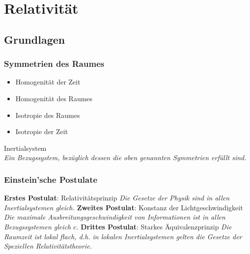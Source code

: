 \documentclass[11pt]{article}
\numberwithin{equation}{section}
\begin{document}
	\section{Relativität}
		\subsection{Grundlagen}
			\subsubsection{Symmetrien des Raumes}
        \begin{itemize}
          \item Homogenität der Zeit
          \item Homogenität des Raumes
          \item Isotropie des Raumes
          \item Isotropie der Zeit
        \end{itemize}
        Inertialsystem \\
          \indent \emph{Ein Bezugssystem, bezüglich dessen die oben genannten Symmetrien erfüllt sind.}

			\subsubsection{Einstein'sche Postulate}
        \textbf{Erstes Postulat}: Relativitätsprinzip \newline
          \indent \textit{Die Gesetze der Physik sind in allen Inertialsystemen gleich.}  \nl
        \textbf{Zweites Postulat}: Konstanz der Lichtgeschwindigkeit \newline
          \indent \textit{Die maximale Ausbreitungsgeschwindigkeit von Informationen ist in allen Bezugssystemen gleich $c$.}  \nl
        \textbf{Drittes Postulat}: Starkes Äquivalenzprinzip \newline
          \indent \textit{Die Raumzeit ist lokal flach, d.h. in lokalen Inertialsystemen gelten die Gesetze der Speziellen Relativitätstheorie.}  \vsp

\end{document}
